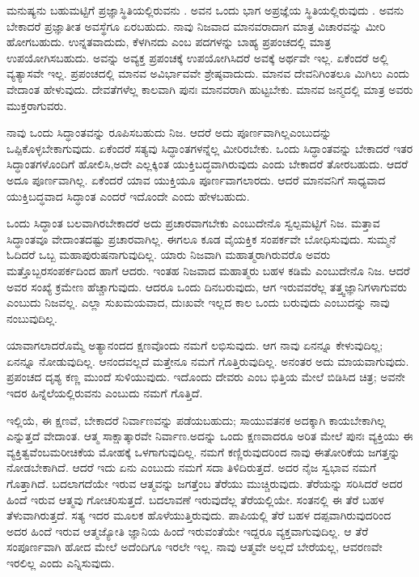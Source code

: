 ಮನುಷ್ಯನು ಬಹುಮಟ್ಟಿಗೆ ಪ್ರಜ್ಞಾಸ್ಥಿತಿಯಲ್ಲಿರುವನು . ಅವನ ಒಂದು ಭಾಗ ಅಪ್ರಜ್ಞೆಯ ಸ್ಥಿತಿಯಲ್ಲಿರುವುದು . ಅವನು ಬೇಕಾದರೆ ಪ್ರಜ್ಞಾತೀತ ಅವಸ್ಥೆಗೂ  ಏರಬಹುದು. ನಾವು ನಿಜವಾದ ಮಾನವರಾದಾಗ ಮಾತ್ರ ವಿಚಾರವನ್ನು ಮೀರಿ ಹೋಗಬಹುದು. ಉನ್ನತವಾದುದು, ಕೆಳಗಿನದು ಎಂಬ ಪದಗಳನ್ನು ಬಾಹ್ಯ ಪ್ರಪಂಚದಲ್ಲಿ ಮಾತ್ರ ಉಪಯೋಗಿಸಬಹುದು. ಅವನ್ನು ಅವ್ಯಕ್ತ ಪ್ರಪಂಚಕ್ಕೆ ಉಪಯೋಗಿಸಿದರೆ ಅವಕ್ಕೆ ಅರ್ಥವೇ ಇಲ್ಲ. ಏಕೆಂದರೆ ಅಲ್ಲಿ ವ್ಯತ್ಯಾಸವೇ ಇಲ್ಲ. ಪ್ರಪಂಚದಲ್ಲಿ ಮಾನವ ಅವಿರ್ಭಾವವೇ ಶ್ರೇಷ್ಠವಾದುದು. ಮಾನವ ದೇವನಿಗಿಂತಲೂ ಮಿಗಿಲು ಎಂದು ವೇದಾಂತ ಹೇಳುವುದು. ದೇವತೆಗಳೆಲ್ಲ ಕಾಲವಾಗಿ ಪುನಃ ಮಾನವರಾಗಿ ಹುಟ್ಟಬೇಕು. ಮಾನವ ಜನ್ಮದಲ್ಲಿ ಮಾತ್ರ ಅವರು ಮುಕ್ತರಾಗುವರು.

ನಾವು ಒಂದು ಸಿದ್ಧಾಂತವನ್ನು ರೂಪಿಸಬಹುದು ನಿಜ. ಆದರೆ ಅದು ಪೂರ್ಣವಾಗಿಲ್ಲ\break ಎಂಬುದನ್ನು ಒಪ್ಪಿಕೊಳ್ಳಬೇಕಾಗುವುದು. ಏಕೆಂದರೆ ಸತ್ಯವು ಸಿದ್ಧಾಂತಗಳನ್ನೆಲ್ಲ ಮೀರಿರಬೇಕು. ಒಂದು ಸಿದ್ಧಾಂತವನ್ನು ಬೇಕಾದರೆ ಇತರ ಸಿದ್ಧಾಂತಗಳೊಂದಿಗೆ ಹೋಲಿಸಿ,\break ಅದೇ ಎಲ್ಲಕ್ಕಿಂತ ಯುಕ್ತಿಬದ್ಧವಾಗಿರುವುದು ಎಂದು ಬೇಕಾದರೆ ತೋರಬಹುದು. ಆದರೆ ಅದೂ ಪೂರ್ಣವಾಗಿಲ್ಲ. ಏಕೆಂದರೆ ಯಾವ ಯುಕ್ತಿಯೂ ಪೂರ್ಣವಾಗಲಾರದು. ಆದರೆ ಮಾನವನಿಗೆ ಸಾಧ್ಯವಾದ ಯುಕ್ತಿಬದ್ಧವಾದ ಸಿದ್ಧಾಂತ ಎಂದರೆ ಇದೊಂದೇ ಎಂದು ಹೇಳಬಹುದು.

ಒಂದು ಸಿದ್ಧಾಂತ ಬಲವಾಗಿರಬೇಕಾದರೆ ಅದು ಪ್ರಚಾರವಾಗಬೇಕು ಎಂಬುದೇನೊ ಸ್ವಲ್ಪಮಟ್ಟಿಗೆ ನಿಜ. ಮತ್ತಾವ ಸಿದ್ಧಾಂತವೂ ವೇದಾಂತದಷ್ಟು ಪ್ರಚಾರವಾಗಿಲ್ಲ. ಈಗಲೂ ಕೂಡ ವೈಯಕ್ತಿಕ ಸಂಪರ್ಕವೇ ಬೋಧಿಸುವುದು. ಸುಮ್ಮನೆ ಓದಿದರೆ ಒಬ್ಬ ಮಹಾಪುರುಷನಾಗುವುದಿಲ್ಲ. ಯಾರು ನಿಜವಾಗಿ ಮಹಾತ್ಮರಾಗಿರುವರೊ ಅವರು ಮತ್ತೊಬ್ಬರ\break ಸಂಪರ್ಕದಿಂದ ಹಾಗೆ ಆದರು. ಇಂತಹ ನಿಜವಾದ ಮಹಾತ್ಮರು ಬಹಳ ಕಡಿಮೆ ಎಂಬುದೇನೊ ನಿಜ. ಆದರೆ ಅವರ ಸಂಖ್ಯೆ ಕ್ರಮೇಣ ಹೆಚ್ಚಾಗುವುದು. ಆದರೂ ಒಂದು ದಿನ\break ಬರುವುದು, ಆಗ ಇರುವವರೆಲ್ಲ ತತ್ತ್ವಜ್ಞಾನಿಗಳಾಗುವರು ಎಂಬುದು ನಿಜವಲ್ಲ. ಎಲ್ಲಾ ಸುಖಮಯವಾದ, ದುಃಖವೇ ಇಲ್ಲದ ಕಾಲ ಒಂದು ಬರುವುದು ಎಂಬುದನ್ನು ನಾವು ನಂಬುವುದಿಲ್ಲ.

ಯಾವಾಗಲಾದರೊಮ್ಮೆ ಅತ್ಯಾನಂದದ ಕ್ಷಣವೊಂದು ನಮಗೆ ಲಭಿಸುವುದು. ಆಗ ನಾವು ಏನನ್ನೂ ಕೇಳುವುದಿಲ್ಲ; ಏನನ್ನೂ ನೋಡುವುದಿಲ್ಲ. ಆನಂದವಲ್ಲದೆ ಮತ್ತೇನೂ ನಮಗೆ ಗೊತ್ತಿರುವುದಿಲ್ಲ. ಅನಂತರ ಅದು ಮಾಯವಾಗುವುದು. ಪ್ರಪಂಚದ ದೃಶ್ಯ ಕಣ್ಣ ಮುಂದೆ ಸುಳಿಯುವುದು. ಇದೊಂದು ದೇವರು ಎಂಬ ಭಿತ್ತಿಯ ಮೇಲೆ ಬಿಡಿಸಿದ ಚಿತ್ರ; ಅವನೇ ಇದರ ಹಿನ್ನೆಲೆಯಲ್ಲಿರುವನು ಎಂಬುದು ನಮಗೆ ಗೊತ್ತಿದೆ.

ಇಲ್ಲಿಯೆ, ಈ ಕ್ಷಣವೆ, ಬೇಕಾದರೆ ನಿರ್ವಾಣವನ್ನು ಪಡೆಯಬಹುದು; ಸಾಯುವ\break ತನಕ ಅದಕ್ಕಾಗಿ ಕಾಯಬೇಕಾಗಿಲ್ಲ ಎನ್ನುತ್ತದೆ ವೇದಾಂತ. ಆತ್ಮ ಸಾಕ್ಷಾತ್ಕಾರವೇ ನಿರ್ವಾಣ.\break ಅದನ್ನು ಒಂದು ಕ್ಷಣವಾದರೂ ಅರಿತ ಮೇಲೆ ಪುನಃ ವ್ಯಕ್ತಿಯು ಈ ವ್ಯಕ್ತಿತ್ವವೆಂಬ\break ಮರೀಚಿಕೆಯ ಮೋಹಕ್ಕೆ ಒಳಗಾಗುವುದಿಲ್ಲ. ನಮಗೆ ಕಣ್ಣಿರುವುದರಿಂದ ನಾವು ಈ\break ತೋರಿಕೆಯ ಜಗತ್ತನ್ನು ನೋಡಬೇಕಾಗಿದೆ. ಆದರೆ ಇದು ಏನು ಎಂಬುದು ನಮಗೆ ಸದಾ ತಿಳಿದಿರುತ್ತದೆ. ಅದರ ನೈಜ ಸ್ವಭಾವ ನಮಗೆ ಗೊತ್ತಾಗಿದೆ. ಬದಲಾಗದೆಯೇ ಇರುವ ಆತ್ಮವನ್ನು ಜಗತ್ತೆಂಬ ತೆರೆಯು ಮುಚ್ಚಿರುವುದು. ತೆರೆಯನ್ನು ಸರಿಸಿದರೆ ಅದರ ಹಿಂದೆ ಇರುವ ಆತ್ಮವು ಗೋಚರಿಸುತ್ತದೆ. ಬದಲಾವಣೆ ಇರುವುದೆಲ್ಲ ತೆರೆಯಲ್ಲಿಯೇ. ಸಂತನಲ್ಲಿ ಈ ತೆರೆ ಬಹಳ ತೆಳುವಾಗಿರುತ್ತದೆ. ಸತ್ಯ ಇದರ ಮೂಲಕ ಹೊಳೆಯುತ್ತಿರುವುದು. ಪಾಪಿಯಲ್ಲಿ ತೆರೆ ಬಹಳ ದಪ್ಪವಾಗಿರುವುದರಿಂದ ಅದರ ಹಿಂದೆ ಇರುವ ಆತ್ಮಜ್ಯೋತಿ ಜ್ಞಾನಿಯ ಹಿಂದೆ ಇರುವಂತೆಯೇ ಇದ್ದರೂ ವ್ಯಕ್ತವಾಗುವುದಿಲ್ಲ. ಆ ತೆರೆ ಸಂಪೂರ್ಣವಾಗಿ ಹೋದ ಮೇಲೆ ಅದೆಂದಿಗೂ ಇರಲೇ ಇಲ್ಲ. ನಾವು ಆತ್ಮವೇ ಅಲ್ಲದೆ ಬೇರೆಯಲ್ಲ, ಆವರಣವೇ ಇರಲಿಲ್ಲ ಎಂದು ಎನ್ನಿಸುವುದು.

